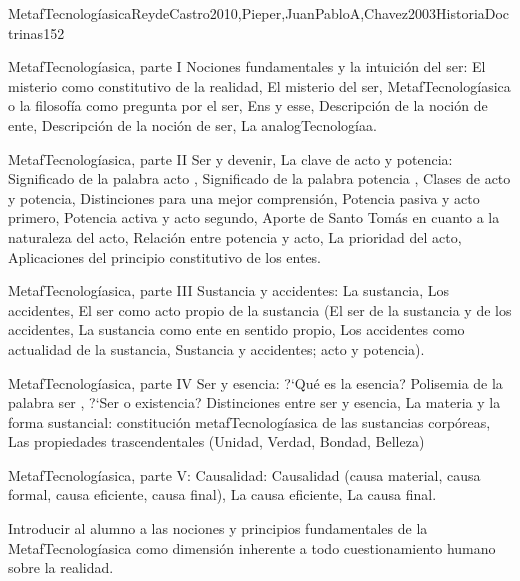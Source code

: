 \begin{syllabus}
\begin{unit}{MetafTecnologíasica}{ReydeCastro2010,Pieper,JuanPabloA,Chavez2003HistoriaDoctrinas}{15}{2}
\begin{topics}
	\item MetafTecnologíasica, parte I  Nociones fundamentales y la intuición del ser: El misterio como constitutivo de la realidad, El misterio del ser, MetafTecnologíasica o la filosofía como pregunta por el ser, Ens y esse, Descripción de la noción de ente, Descripción de la noción de ser, La analogTecnologíaa.
	\item MetafTecnologíasica, parte II  Ser y devenir, La clave de acto y potencia: Significado de la palabra  acto , Significado de la palabra  potencia , Clases de acto y potencia, Distinciones para una mejor comprensión, Potencia pasiva y acto primero, Potencia activa y acto segundo, Aporte de Santo Tomás en cuanto a la naturaleza del acto, Relación entre potencia y acto, La prioridad del acto, Aplicaciones del principio constitutivo de los entes.
	\item MetafTecnologíasica, parte III  Sustancia y accidentes: La sustancia, Los accidentes, El ser como acto propio de la sustancia (El ser de la sustancia y de los accidentes, La sustancia como ente en sentido propio, Los accidentes como actualidad de la sustancia, Sustancia y accidentes; acto y potencia).
	\item MetafTecnologíasica, parte IV  Ser y esencia: ?`Qué es la esencia? Polisemia de la palabra  ser , ?`Ser o existencia? Distinciones entre ser y esencia, La materia y la forma sustancial: constitución metafTecnologíasica de las sustancias corpóreas, Las propiedades trascendentales (Unidad, Verdad, Bondad, Belleza)
	\item MetafTecnologíasica, parte V: Causalidad: Causalidad (causa material, causa formal, causa eficiente, causa final), La causa eficiente, La causa final.
\end{topics}

\begin{learningoutcomes}
	\item Introducir al alumno a las nociones y principios fundamentales de la MetafTecnologíasica como dimensión inherente a todo cuestionamiento humano sobre la realidad.
\end{learningoutcomes}
\end{unit}



\begin{coursebibliography}
\end{coursebibliography}

\end{syllabus}

